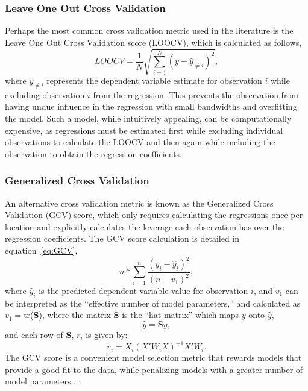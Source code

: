 \documentclass{article}\usepackage[]{graphicx}\usepackage[]{color}
\begin{document}
\subsubsection{Leave One Out Cross Validation}
Perhaps the most common cross validation metric used in the literature is the Leave One Out Cross Validation score (LOOCV), which is calculated as follows,
\begin{equation}\label{eq:LOOCV}
LOOCV = \frac{1}{N} \sqrt{\sum _{i = 1}^{N} (y - \hat{y}_{\neq i})^2},  
\end{equation}
where $\hat{y}_{\neq i}$ represents the dependent variable estimate for observation $i$ while excluding observation $i$ from the regression. This prevents the observation from having undue influence in the regression with small bandwidths and overfitting the model. Such a model, while intuitively appealing, can be computationally expensive, as regressions must be estimated first while excluding individual observations to calculate the LOOCV and then again while including the observation to obtain the regression coefficients.

\subsubsection{Generalized Cross Validation}
An alternative cross validation metric is known as the Generalized Cross Validation (GCV) score, which only requires calculating the regressions once per location and explicitly calculates the leverage each observation has over the regression coefficients. The GCV score calculation is detailed in equation~\eqref{eq:GCV},
\begin{equation}\label{eq:GCV}
n*\sum_{i=1}^{n}\frac{(y_i-\hat{y}_i)^2}{(n-v_1)^2}, 
\end{equation} 
where $\hat{y}_i$ is the predicted dependent variable value for observation $i$, and $v_1$ can be interpreted as the ``effective number of model parameters,'' and calculated as $v_1=$tr(\textbf{S}), where the matrix \textbf{S} is the ``hat matrix'' which maps $y$ onto $\hat{y}$,
                   \begin{equation}
                   \hat{y}=\textbf{S}y,
                   \end{equation}
                   and each row of \textbf{S}, $r_i$ is given by:
                  \begin{equation}
                   r_i=X_i(X'W_iX)^{-1}X'W_i.
                   \end{equation}
The GCV score is a convenient model selection metric that rewards models that provide a good fit to the data, while penalizing models with a greater number of model parameters \citep{Loader1999, McMillen2010}.  \citep{Paez2011, McMillen2010, McMillen2012}. 
\end{document}
